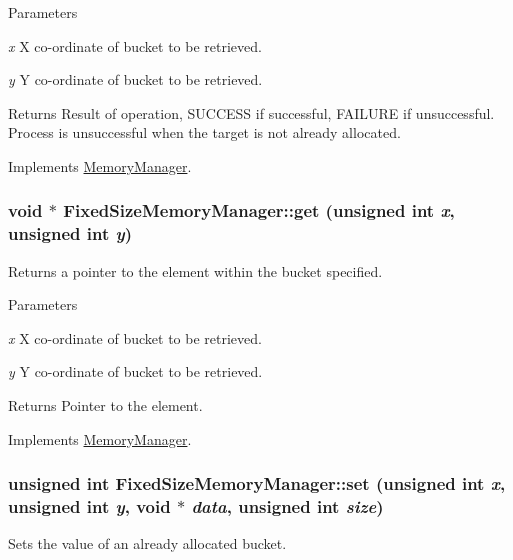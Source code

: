 \begin{DoxyParams}{Parameters}
\item[{\em x}]X co-\/ordinate of bucket to be retrieved. \item[{\em y}]Y co-\/ordinate of bucket to be retrieved.\end{DoxyParams}
\begin{DoxyReturn}{Returns}
Result of operation, SUCCESS if successful, FAILURE if unsuccessful. Process is unsuccessful when the target is not already allocated. 
\end{DoxyReturn}


Implements \hyperlink{classMemoryManager_af63cdf4a0fdbd5eb328e13959ff4c5b5}{MemoryManager}.

\hypertarget{classFixedSizeMemoryManager_a25a2676e266db960adffab1630323e70}{
\subsubsection[{get}]{\setlength{\rightskip}{0pt plus 5cm}void $\ast$ FixedSizeMemoryManager::get (unsigned int {\em x}, \/  unsigned int {\em y})}}
\label{classFixedSizeMemoryManager_a25a2676e266db960adffab1630323e70}
Returns a pointer to the element within the bucket specified.


\begin{DoxyParams}{Parameters}
\item[{\em x}]X co-\/ordinate of bucket to be retrieved. \item[{\em y}]Y co-\/ordinate of bucket to be retrieved.\end{DoxyParams}
\begin{DoxyReturn}{Returns}
Pointer to the element. 
\end{DoxyReturn}


Implements \hyperlink{classMemoryManager_ad1786ab026c6077405e3c963e05d4a26}{MemoryManager}.

\hypertarget{classFixedSizeMemoryManager_a10ce34ce45161cf96e5e1232b8f45894}{
\subsubsection[{set}]{\setlength{\rightskip}{0pt plus 5cm}unsigned int FixedSizeMemoryManager::set (unsigned int {\em x}, \/  unsigned int {\em y}, \/  void $\ast$ {\em data}, \/  unsigned int {\em size})}}
\label{classFixedSizeMemoryManager_a10ce34ce45161cf96e5e1232b8f45894}
Sets the value of an already allocated bucket.


